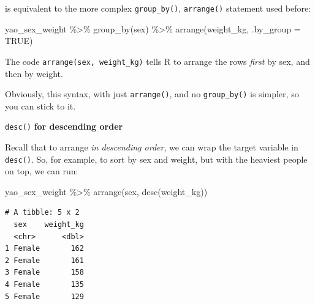 \documentclass[
  letterpaper,
  DIV=11,
  numbers=noendperiod]{scrreprt}
\newenvironment{Shaded}{\begin{snugshade}}{\end{snugshade}}
\newcommand{\AttributeTok}[1]{\textcolor[rgb]{0.40,0.45,0.13}{#1}}
\newcommand{\ConstantTok}[1]{\textcolor[rgb]{0.56,0.35,0.01}{#1}}
\newcommand{\FunctionTok}[1]{\textcolor[rgb]{0.28,0.35,0.67}{#1}}
\newcommand{\NormalTok}[1]{\textcolor[rgb]{0.00,0.23,0.31}{#1}}
\newcommand{\SpecialCharTok}[1]{\textcolor[rgb]{0.37,0.37,0.37}{#1}}
\begin{document}
is equivalent to the more complex \texttt{group\_by()},
\texttt{arrange()} statement used before:

\begin{Shaded}
\begin{Highlighting}[]
\NormalTok{yao\_sex\_weight }\SpecialCharTok{\%\textgreater{}\%} 
  \FunctionTok{group\_by}\NormalTok{(sex) }\SpecialCharTok{\%\textgreater{}\%} 
  \FunctionTok{arrange}\NormalTok{(weight\_kg, }\AttributeTok{.by\_group =} \ConstantTok{TRUE}\NormalTok{)}
\end{Highlighting}
\end{Shaded}

The code \texttt{arrange(sex,\ weight\_kg)} tells R to arrange the rows
\emph{first} by sex, and then by weight.

Obviously, this syntax, with just \texttt{arrange()}, and no
\texttt{group\_by()} is simpler, so you can stick to it.

\texttt{desc()} \textbf{for descending order}

Recall that to arrange \emph{in descending order}, we can wrap the
target variable in \texttt{desc()}. So, for example, to sort by sex and
weight, but with the heaviest people on top, we can run:

\begin{Shaded}
\begin{Highlighting}[]
\NormalTok{yao\_sex\_weight }\SpecialCharTok{\%\textgreater{}\%} 
  \FunctionTok{arrange}\NormalTok{(sex, }\FunctionTok{desc}\NormalTok{(weight\_kg))}
\end{Highlighting}
\end{Shaded}

\begin{verbatim}
# A tibble: 5 x 2
  sex    weight_kg
  <chr>      <dbl>
1 Female       162
2 Female       161
3 Female       158
4 Female       135
5 Female       129
\end{verbatim}
\end{document}
